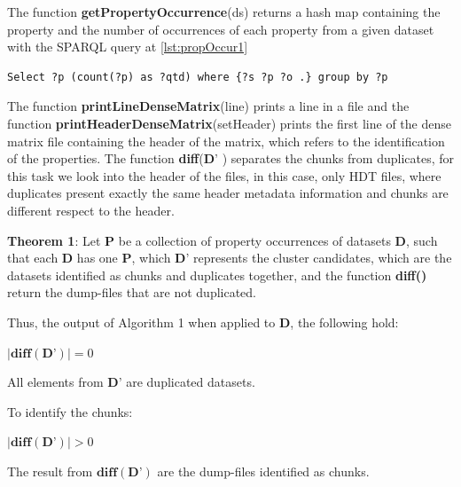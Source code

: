 \documentclass[sw]{iosart2x}
\begin{document}
The function \textbf{getPropertyOccurrence}(ds) returns a hash map containing the property and the number of occurrences of each property from a given dataset with the SPARQL query at \cref{lst:propOccur1} 

\begin{lstlisting}[language=SPARQL, label={lst:propOccur1}, caption=Property occurrence query.]
Select ?p (count(?p) as ?qtd) where {?s ?p ?o .} group by ?p
\end{lstlisting}
The function \textbf{printLineDenseMatrix}(line) prints a line in a file and the function \textbf{printHeaderDenseMatrix}(setHeader) prints the first line of the dense matrix file containing the header of the matrix, which refers to the identification of the properties.
The function \textbf{diff}($\mathbf{D’}$ ) separates the chunks from duplicates, for this task we look into the header of the files, in this case, only HDT files, where duplicates present exactly the same header metadata information and chunks are different respect to the header.

\textbf{Theorem 1}: Let $\mathbf{P}$ be a collection of property occurrences of datasets $\mathbf{D}$, such that each $\mathbf{D}$ has one $\mathbf{P}$, which $\mathbf{D’}$ represents the cluster candidates, which are the datasets identified as chunks and duplicates together, and the function \textbf{diff()} return the dump-files that are not duplicated.

Thus, the output of Algorithm 1 when applied to $\mathbf{D}$, the following hold:

$|\textbf{diff}(\mathbf{D’})| = 0$

All elements from $\mathbf{D’}$ are duplicated datasets.

To identify the chunks:

$|\textbf{diff}(\mathbf{D’})| > 0$

The result from $\textbf{diff}(\mathbf{D’})$ are the dump-files identified as chunks.


\end{document}
